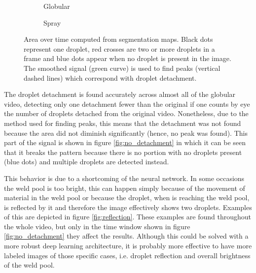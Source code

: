 \begin{figure}
  \begin{subfigure}[b]{\textwidth}
    
    \caption{Globular}
    \label{fig:globular_areas}
  \end{subfigure}
\vfill
  \begin{subfigure}[b]{\textwidth}
    
    \caption{Spray}
    \label{fig:spray_areas}
  \end{subfigure}
  \caption[Area over time computed from segmentation maps]{Area over time computed from segmentation maps. Black dots represent one droplet, red crosses are two or more droplets in a frame and blue dots appear when no droplet is present in the image. The smoothed signal (green curve) is used to find peaks (vertical dashed lines) which correspond with droplet detachment.} 
\end{figure}

The droplet detachment is found accurately across almost all of the globular video, detecting only one detachment fewer than the original if one counts by eye the number of droplets detached from the original video. Nonetheless, due to the method used for finding peaks, this means that the detachment was not found because the area did not diminish significantly (hence, no peak was found). This part of the signal is shown in figure \ref{fig:no_detachment} in which it can be seen that it breaks the pattern because there is no portion with no droplets present (blue dots) and multiple droplets are detected instead.

This behavior is due to a shortcoming of the neural network. In some occasions the weld pool is too bright, this can happen simply because of the movement of material in the weld pool or because the droplet, when is reaching the weld pool, is reflected by it and therefore the image effectively shows two droplets. Examples of this are depicted in figure \ref{fig:reflection}. These examples are found throughout the whole video, but only in the time window shown in figure \ref{fig:no_detachment} they affect the results. Although this could be solved with a more robust deep learning architecture, it is probably more effective to have more labeled images of those specific cases, i.e. droplet reflection and overall brightness of the weld pool.

